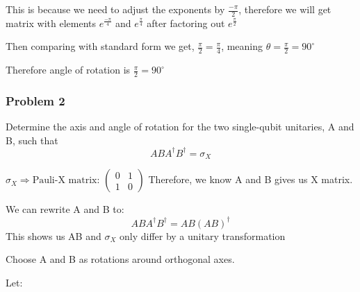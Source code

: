 \documentclass[12pt]{article}
\begin{document}
This is because we need to adjust the exponents by $\frac{-\pi}{2}$, therefore we will get matrix with elements $e^{\frac{-\pi}{4}}$ and $e^{\frac{\pi}{4}}$ after factoring out $e^{\frac{\pi}{2}}$

Then comparing with standard form we get, $\frac{\pi}{2} = \frac{\pi}{4}$, meaning $\theta = \frac{\pi}{2} = 90^\circ$

Therefore angle of rotation is $\frac{\pi}{2} = 90^\circ$


\subsubsection*{Problem 2}
Determine the axis and angle of rotation for the two single-qubit unitaries, A and B, such that
\[
    ABA^\dagger B^\dagger = \sigma_X
\] 

$\sigma_X \Rightarrow \text{Pauli-X matrix: }\begin{pmatrix} 0 & 1 \\ 1 & 0 \end{pmatrix}$ 
Therefore, we know A and B gives us X matrix.

We can rewrite A and B to:
\[
    ABA^{\dagger}B^{\dagger}= AB(AB)^\dagger
\] 
This shows us AB and $\sigma_X$ only differ by a unitary transformation

Choose A and B as rotations around orthogonal axes.

Let:
\end{document}
